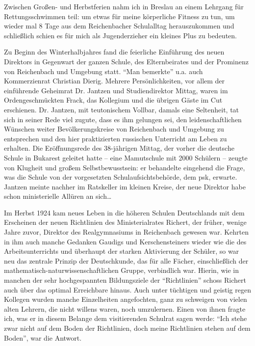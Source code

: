 \documentclass[a5paper,pagesize,10pt,twoside=true]{scrbook}
\begin{document}
Zwischen Großen- und Herbstferien nahm ich in Breslau an einem Lehrgang für Rettungsschwimmen teil: um etwas für meine körperliche Fitness zu tun, um wieder mal 8 Tage aus dem Reichenbacher Schulalltag herauszukommen und schließlich schien es für mich als Jugenderzieher ein kleines Plus zu bedeuten.

Zu Beginn des Winterhalbjahres fand die feierliche Einführung des neuen Direktors in Gegenwart der ganzen Schule, des Elternbeirates und der Prominenz von Reichenbach und Umgebung statt. \enquote{Man bemerkte} u.a. auch Kommerzienrat Christian Dierig. Mehrere Persönlichkeiten, vor allem der einführende Geheimrat Dr. Jantzen und Studiendirektor Mittag, waren im Ordengeschmückten Frack, das Kollegium und die übrigen Gäste im Cut erschienen. Dr. Jantzen, mit teutonischem Vollbar, damals eine Seltenheit, tat sich in seiner Rede viel zugute, dass es ihm gelungen sei, den leidenschaftlichen Wünschen weiter Bevölkerungskreise von Reichenbach und Umgebung zu entsprechen und den hier praktizierten russischen Unterricht am Leben zu erhalten. Die Eröffnungsrede des 38-jährigen Mittag, der vorher die deutsche Schule in Bukarest geleitet hatte -- eine Mamutschule mit 2000 Schülern -- zeugte von Klugheit und großem Selbstbewusstsein: er behandelte eingehend die Frage, was die Schule von der vorgesetzten Schulaufsichtsbehörde, dem \ac{psk}, erwarte. Jantzen meinte nachher im Ratskeller im kleinen Kreise, der neue Direktor habe schon ministerielle Allüren an sich\dots

Im Herbst 1924 kam neues Leben in die höheren Schulen Deutschlands mit dem Erscheinen der neuen Richtlinien des Ministerialrates Richert, der früher, wenige Jahre zuvor, Direktor des Realgymnasiums in Reichenbach gewesen war. Kehrten in ihm auch manche Gedanken Gaudigs und Kerschensteiners wieder wie die des Arbeitsunterrichts und überhaupt der starken Aktivierung der Schüler, so war neu das zentrale Prinzip der Deutschkunde, das für alle Fächer, einschließlich der mathematisch-naturwissenschaftlichen Gruppe, verbindlich war. Hierin, wie in manchen der sehr hochgespannten Bildungsziele der \enquote{Richtlinien} schoss Richert auch über das optimal Erreichbare hinaus. Auch unter tüchtigen und geistig regen Kollegen wurden manche Einzelheiten angefochten, ganz zu schweigen von vielen alten Lehrern, die nicht willens waren, noch umzulernen. Einen von ihnen fragte ich, was er in diesem Belange dem visitierenden Schulrat sagen werde: \enquote{Ich stehe zwar nicht auf dem Boden der Richtlinien, doch meine Richtlinien stehen auf dem Boden}, war die Antwort.
\end{document}
